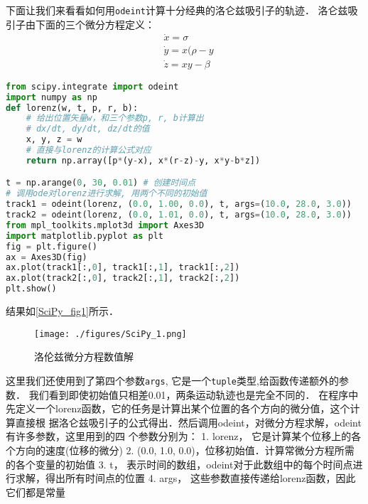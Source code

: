 下面让我们来看看如何用\verb|odeint|计算十分经典的洛仑兹吸引子的轨迹． 洛仑兹吸引子由下面的三个微分方程定义：
\begin{align}
&\dot{x}=\sigma\\
&\dot{y}=x(\rho-y\\
&\dot{z}=xy-\beta
\end{align}
\begin{lstlisting}[language=python]
from scipy.integrate import odeint
import numpy as np
def lorenz(w, t, p, r, b):
    # 给出位置矢量w，和三个参数p, r, b计算出
    # dx/dt, dy/dt, dz/dt的值
    x, y, z = w
    # 直接与lorenz的计算公式对应
    return np.array([p*(y-x), x*(r-z)-y, x*y-b*z])

t = np.arange(0, 30, 0.01) # 创建时间点
# 调用ode对lorenz进行求解, 用两个不同的初始值
track1 = odeint(lorenz, (0.0, 1.00, 0.0), t, args=(10.0, 28.0, 3.0))
track2 = odeint(lorenz, (0.0, 1.01, 0.0), t, args=(10.0, 28.0, 3.0))
from mpl_toolkits.mplot3d import Axes3D
import matplotlib.pyplot as plt
fig = plt.figure()
ax = Axes3D(fig)
ax.plot(track1[:,0], track1[:,1], track1[:,2])
ax.plot(track2[:,0], track2[:,1], track2[:,2])
plt.show()
\end{lstlisting}
结果如\autoref{SciPy_fig1}所示．
\begin{figure}[ht]
\centering
\texttt{[image: ./figures/SciPy\_1.png]}
\caption{洛伦兹微分方程数值解} \label{SciPy_fig1}
\end{figure}

这里我们还使用到了第四个参数\verb|args|, 它是一个\verb|tuple|类型,给函数传递额外的参数．
我们看到即使初始值只相差0.01，两条运动轨迹也是完全不同的．
在程序中先定义一个lorenz函数，它的任务是计算出某个位置的各个方向的微分值，这个计算直接根
据洛仑兹吸引子的公式得出．然后调用odeint，对微分方程求解，odeint有许多参数，这里用到的四
个参数分别为：
1. lorenz， 它是计算某个位移上的各个方向的速度(位移的微分)
2. (0.0, 1.0, 0.0)，位移初始值．计算常微分方程所需的各个变量的初始值
3. t， 表示时间的数组，odeint对于此数组中的每个时间点进行求解，得出所有时间点的位置
4. args， 这些参数直接传递给lorenz函数，因此它们都是常量